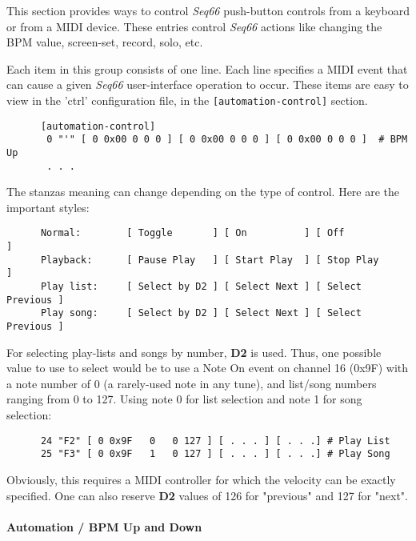    This section provides ways to control \textsl{Seq66} push-button controls
   from a keyboard or from a MIDI device.
   These entries control
   \textsl{Seq66} actions like changing the BPM value, screen-set,
   record, solo, etc.
   
   Each item in this group consists of one line.  Each line
   specifies a MIDI event that can cause a given
   \textsl{Seq66} user-interface operation to occur.
   These items are easy to view in the 'ctrl' configuration file,
   in the \texttt{[automation-control]} section.

   \begin{verbatim}
      [automation-control]
       0 "'" [ 0 0x00 0 0 0 ] [ 0 0x00 0 0 0 ] [ 0 0x00 0 0 0 ]  # BPM Up
       . . .
   \end{verbatim}

   The stanzas meaning can change depending on the type of control.  Here are
   the important styles:

   \begin{verbatim}
      Normal:        [ Toggle       ] [ On          ] [ Off             ]
      Playback:      [ Pause Play   ] [ Start Play  ] [ Stop Play       ]
      Play list:     [ Select by D2 ] [ Select Next ] [ Select Previous ]
      Play song:     [ Select by D2 ] [ Select Next ] [ Select Previous ]
   \end{verbatim}

   For selecting play-lists and songs by number, \textbf{D2} is used.
   Thus, one possible value to use to select would be to use a 
   Note On event on channel 16 (0x9F) with a note number of 0 (a rarely-used
   note in any tune), and list/song numbers ranging from 0 to 127.  Using note
   0 for list selection and note 1 for song selection:

   \begin{verbatim}
      24 "F2" [ 0 0x9F   0   0 127 ] [ . . . ] [ . . .] # Play List
      25 "F3" [ 0 0x9F   1   0 127 ] [ . . . ] [ . . .] # Play Song
   \end{verbatim}

   Obviously, this requires a MIDI controller for which the velocity can be
   exactly specified.  One can also reserve \textbf{D2} values of 126 for
   "previous" and 127 for "next".

\paragraph{Automation / BPM Up and Down}
\label{paragraph:configuration_midi_ctrl_bpmupdn}

